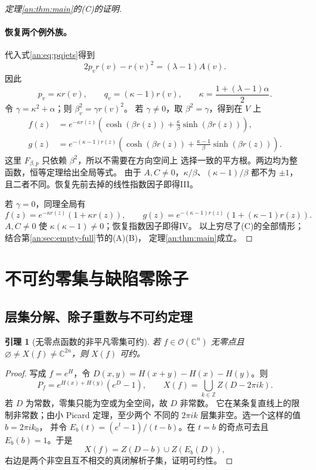 \documentclass[11pt,a4paper,oneside,openany]{book}
\theoremstyle{lecture}
\newtheorem{lemma}[theorem]{引理}
\newcommand{\C}{\mathbb C}
\newcommand{\OO}{\mathcal O}
\newcommand{\e}{e}
\numberwithin{equation}{section}
\begin{document}
\begin{proof}[定理\ref{an:thm:main}的(C)的证明]
\paragraph{恢复两个例外族。}
代入式\eqref{an:eq:pqjets}得到
\[
 2p_vr(v)-r(v)^2=(\lambda-1)A(v).
\]
因此
\begin{equation}\label{an:eq:pqlinear}
 p_v=\kappa r(v),\qquad q_v=(\kappa-1)r(v),\qquad
 \kappa=\frac{1+(\lambda-1)\alpha}{2}.
\end{equation}
令 $\gamma=\kappa^2+\alpha$；则 $\beta_v^2=\gamma r(v)^2$。
若 $\gamma\ne0$，取 $\beta^2=\gamma$，得到在 $V$ 上
\[
 \begin{aligned}
 f(z)&=\e^{-\kappa r(z)}
   \left(\cosh(\beta r(z))+\frac{\kappa}{\beta}\sinh(\beta r(z))\right),\\
 g(z)&=\e^{-(\kappa-1)r(z)}
   \left(\cosh(\beta r(z))+\frac{\kappa-1}{\beta}\sinh(\beta r(z))\right).
 \end{aligned}
\]
这里 $F_{\beta,p}$ 只依赖 $\beta^2$，所以不需要在方向空间上
选择一致的平方根。两边均为整函数，恒等定理给出全局等式。
由于 $A,C\ne0$，$\kappa/\beta$、$(\kappa-1)/\beta$ 都不为
$\pm1$，且二者不同。恢复先前去掉的线性指数因子即得III。

若 $\gamma=0$，同理全局有
\[
 f(z)=\e^{-\kappa r(z)}(1+\kappa r(z)),\qquad
 g(z)=\e^{-(\kappa-1)r(z)}(1+(\kappa-1)r(z)).
\]
$A,C\ne0$ 使 $\kappa(\kappa-1)\ne0$；恢复指数因子即得IV。
以上穷尽了(C)的全部情形；结合第\ref{an:sec:empty-full}节的(A)(B)，
定理\ref{an:thm:main}成立。
\end{proof}

\section{不可约零集与缺陷零除子}\label{an:sec:irreducible}
\subsection{层集分解、除子重数与不可约定理}
\begin{lemma}[无零点函数的非平凡零集可约]\label{an:lem:zerofree}
若 $f\in\OO(\C^n)$ 无零点且
$\varnothing\ne X(f)\ne\C^{2n}$，则 $X(f)$ 可约。
\end{lemma}
\begin{proof}
写成 $f=\e^H$，令
$D(x,y)=H(x+y)-H(x)-H(y)$。则
\[
 P_f=\e^{H(x)+H(y)}(\e^D-1),\qquad
 X(f)=\bigcup_{k\in\mathbb Z}Z(D-2\pi i k).
\]
若 $D$ 为常数，零集只能为空或为全空间，故 $D$ 非常数。
它在某条复直线上的限制非常数；由小 Picard 定理，至少两个
不同的 $2\pi i k$ 层集非空。选一个这样的值 $b=2\pi i k_0$，
并令 $E_b(t)=(\e^t-1)/(t-b)$。在 $t=b$ 的奇点可去且
$E_b(b)=1$。于是
\[
 X(f)=Z(D-b)\cup Z(E_b(D)),
\]
右边是两个非空且互不相交的真闭解析子集，证明可约性。
\end{proof}
\end{document}
